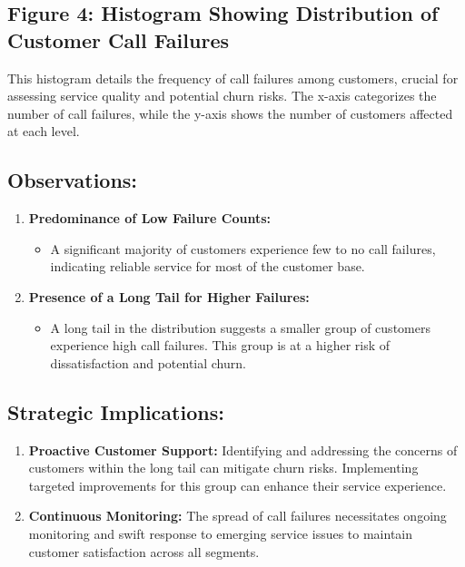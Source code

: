 \documentclass[12pt]{article}
\begin{document}
\subsection*{Figure 4: Histogram Showing Distribution of Customer Call Failures}
This histogram details the frequency of call failures among customers, crucial for assessing service quality and potential churn risks. The x-axis categorizes the number of call failures, while the y-axis shows the number of customers affected at each level.

\subsection*{Observations:}
\begin{enumerate}
    \item \textbf{Predominance of Low Failure Counts:}
    \begin{itemize}
        \item A significant majority of customers experience few to no call failures, indicating reliable service for most of the customer base.
    \end{itemize}
    
    \item \textbf{Presence of a Long Tail for Higher Failures:}
    \begin{itemize}
        \item A long tail in the distribution suggests a smaller group of customers experience high call failures. This group is at a higher risk of dissatisfaction and potential churn.
    \end{itemize}
\end{enumerate}

\subsection*{Strategic Implications:}
\begin{enumerate}
    \item \textbf{Proactive Customer Support:} Identifying and addressing the concerns of customers within the long tail can mitigate churn risks. Implementing targeted improvements for this group can enhance their service experience.
    
    \item \textbf{Continuous Monitoring:} The spread of call failures necessitates ongoing monitoring and swift response to emerging service issues to maintain customer satisfaction across all segments.
\end{enumerate}
\end{document}
